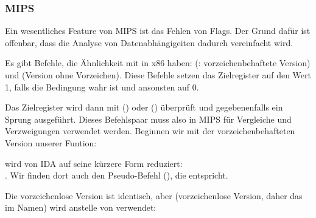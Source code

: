 \subsubsection{MIPS}
Ein wesentliches Feature von MIPS ist das Fehlen von Flags.
Der Grund dafür ist offenbar, dass die Analyse von Datenabhängigeiten dadurch vereinfacht wird.


Es gibt Befehle, die Ähnlichkeit mit  in x86 haben: (: vorzeichenbehaftete
Version) und  (Version ohne Vorzeichen).
Diese Befehle setzen das Zielregister auf den Wert 1, falls die Bedingung wahr ist und ansonsten auf 0.


Das Zielregister wird dann mit  () oder  () überprüft und
gegebenenfalls ein Sprung ausgeführt. 
Dieses Befehlspaar muss also in MIPS für Vergleiche und Verzweigungen verwendet werden.
Beginnen wir mit der vorzeichenbehafteten Version unserer Funtion:



 wird von IDA auf seine kürzere Form reduziert:\\
.
Wir finden dort auch den Pseudo-Befehl  (), die 
entspricht.

Die vorzeichenlose Version ist identisch, aber  (vorzeichenlose Version, daher das  im Namen) wird
anstelle von  verwendet:




